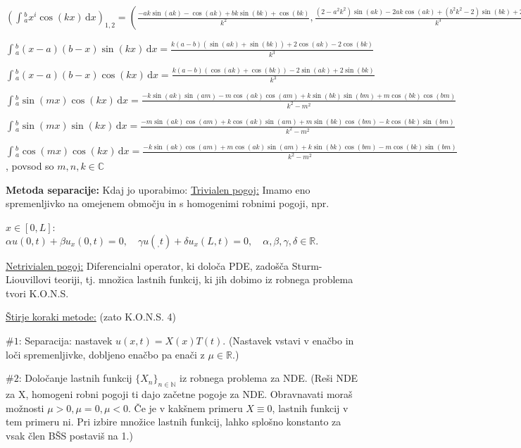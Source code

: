 \documentclass[10pt,a4paper]{amsart}
\theoremstyle{definition} %
\theoremstyle{plain} %
\newcommand{\dx}{\ensuremath{\,\mathrm{d}x}}
\let\oldint\int
\renewcommand{\int}{\oldint \!}
\newcommand{\R}{\mathbb R}
\newcommand{\N}{\mathbb N}
\newcommand{\C}{\mathbb C}
\begin{document}
$(\int_a^bx^i \cos(kx)\dx)_{1,2} = (\frac{-a k \sin (a k)-\cos (a k)+b k \sin (b k)+\cos (b k)}{k^2},\frac{(2-a^2 k^2) \sin (a k)-2 a k \cos (a k)+(b^2 k^2-2) \sin (b k)+2 b k \cos (b k)}{k^3})$

$\int_a^b (x-a)(b-x)\sin(kx)\dx = \frac{k (a-b) (\sin (a k)+\sin (b k))+2 \cos (a k)-2 \cos (b k)}{k^3}$

$\int_a^b (x-a)(b-x)\cos(kx)\dx = \frac{k (a-b) (\cos (a k)+\cos (b k))-2 \sin (a k)+2 \sin (b k)}{k^3}$

$\int_a^b \sin(mx)\cos(kx)\dx = \frac{-k \sin (a k) \sin (a m)-m \cos (a k) \cos (a m)+k \sin (b k) \sin (b m)+m \cos (b k) \cos (b m)}{k^2-m^2}$

$\int_a^b \sin(mx)\sin(kx)\dx = \frac{-m \sin (a k) \cos (a m)+k \cos (a k) \sin (a m)+m \sin (b k) \cos (b m)-k \cos (b k) \sin (b m)}{k^2-m^2}$

$\int_a^b \cos(mx)\cos(kx)\dx = \frac{-k \sin (a k) \cos (a m)+m \cos (a k) \sin (a m)+k \sin (b k) \cos (b m)-m \cos (b k) \sin (b m)}{k^2-m^2}$, povsod so $m, n, k \in \C$


\textbf{Metoda separacije:} Kdaj jo uporabimo: \underline{Trivialen pogoj:}
Imamo eno spremenljivko na omejenem območju in s homogenimi robnimi pogoji, npr.

$x \in [0,L]$: $\alpha u(0,t) + \beta u_x(0,t) = 0, \quad \gamma u(_,t)+\delta
u_x(L,t) = 0, \quad \alpha, \beta, \gamma, \delta \in \R.$

\underline{Netrivialen pogoj:} Diferencialni operator, ki določa PDE, zadošča
Sturm-Liouvillovi teoriji, tj. množica lastnih funkcij, ki jih dobimo iz robnega
problema tvori K.O.N.S.


\underline{Štirje koraki metode:} (zato K.O.N.S. 4)

$\#1$: Separacija: nastavek $u(x,t)=X(x)T(t)$. (Nastavek vstavi v enačbo in loči
spremenljivke, dobljeno enačbo pa enači z $\mu \in \R$.)

$\#2$: Določanje lastnih funkcij $\{X_n\}_{n\in \N}$ iz robnega problema za NDE.
(Reši NDE za X, homogeni robni pogoji ti dajo začetne pogoje za NDE. Obravnavati
moraš možnosti $\mu >0, \mu = 0, \mu < 0$. Če je v kakšnem primeru $X \equiv 0$,
lastnih funkcij v tem primeru ni. Pri izbire množice lastnih funkcij, lahko
splošno konstanto za vsak člen BŠS postaviš na 1.)
\end{document}
